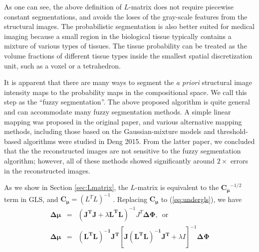 \documentclass[12pt]{book}               %
\begin{document}
As one can see, the above definition of $L$-matrix does not require piecewise constant segmentations, and avoids the loses of the gray-scale features from the structural images. The probabilistic segmentation is also better suited for medical imaging because a small region in the biological tissue typically contains a mixture of various types of tissues. The tissue probability can be treated as the volume fractions of different tissue types inside the smallest spatial discretization unit, such as a voxel or a tetrahedron.

It is apparent that there are many ways to segment the \emph{a priori} structural image intensity maps to the probability maps in the compositional space. We call this step as the ``fuzzy segmentation''. The above proposed algorithm is quite general and can accommodate many fuzzy segmentation methods. A simple linear mapping was proposed in the original paper, and various alternative mapping methods, including those based on the Gaussian-mixture models and threshold-based algorithms were studied in Deng 2015. From the latter paper, we concluded that the the reconstructed images are not sensitive to the fuzzy segmentation algorithm; however, all of these methods showed significantly around $2\times$ errors in the reconstructed images.

As we show in Section \ref{sec:Lmatrix}, the $L$-matrix is equivalent to the $\mathbf{C_\mu}^{-1/2}$ term in GLS, and $\mathbf{C_\mu}=(L^TL)^{-1}$ . Replacing $\mathbf{C_\mu}$ to (\ref{eq:undergls}), we have
\begin{eqnarray}
\mathbf{\Delta\mu}&=& (\mathbf{J^TJ}+\lambda \mathbf{L^TL})^{-1}J^T\mathbf{\Delta\Phi},\,\textrm{ or}\\
\mathbf{\Delta\mu}&=&\mathbf{(L^TL)^{-1} J^T}\left[\mathbf{J(L^TL)^{-1}J^T}+\lambda I\right]^{-1}\mathbf{\Delta\Phi}
\end{eqnarray}
\end{document}
